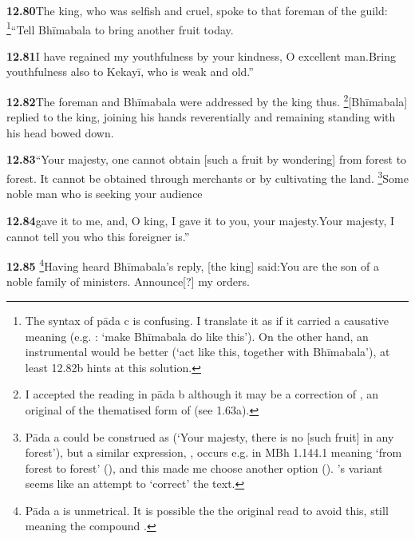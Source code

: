 \textbf{12.80}The king, who was selfish and cruel, spoke to that foreman of the guild:%
\footnote{The syntax of pāda c is confusing. I translate it as if it carried                  a causative meaning (e.g. : `make Bhīmabala do like this').                 On the other hand, an instrumental would be better (`act like this, together with                 Bhīmabala'), at least 12.82b hints at this solution.  }``Tell Bhīmabala to bring another fruit today.%


\textbf{12.81}I have regained my youthfulness by your kindness, O excellent man.Bring youthfulness also to Kekayī, who is weak and old.''%


\textbf{12.82}The foreman and Bhīmabala were addressed by the king thus.%
\footnote{I accepted the reading  in pāda b although it may be a                  correction of , an original  of the thematised                  form of  (see 1.63a).  }[Bhīmabala] replied to the king, joining his hands reverentially                and remaining standing with his head bowed down.%


\textbf{12.83}``Your majesty, one cannot obtain [such a fruit by wondering] from forest to forest.                It cannot be obtained through merchants or by cultivating the land.%
\footnote{  Pāda a could be construed as                          (`Your majesty, there is no [such fruit] in any                         forest'), but a similar expression, , occurs e.g. in MBh                         1.144.1 meaning `from forest to forest' (), and this made me                         choose another option (). \Ed's variant                         seems like an attempt to `correct'                         the text.                   }Some noble man who is seeking your audience%


\textbf{12.84}gave it to me, and, O king, I gave it to you, your majesty.Your majesty, I cannot tell you who this foreigner is.''%


\textbf{12.85}%
\footnote{Pāda a is unmetrical. It is possible the the original read  to avoid this,                 still meaning the compound .  }Having heard Bhīmabala's reply, [the king] said:You are the son of a noble family of ministers.  Announce[?] my orders.%


